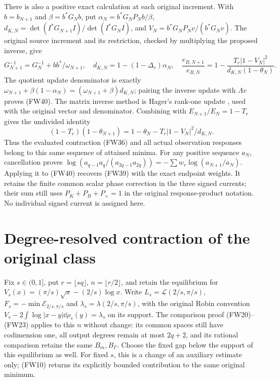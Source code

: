 \documentclass[11pt]{article}
\begin{document}
There is also a positive exact calculation at each original increment.
With $b=b_{N+1}$ and $\beta=b^*G_Nb$, put
$\alpha_N=b^*G_NP_Nb/\beta$,
$d_{K,N}=\det(I^*G_{N+1}I)/\det(I^*G_NI)$, and
$V_N=b^*G_NP_Nv/(b^*G_Nv)$. The original source increment and its
restriction, checked by multiplying the proposed inverse, give
\begin{equation}\tag{FW40}
 G_{N+1}^{-1}=G_N^{-1}+bb^*/\omega_{N+1},\quad
 d_{K,N}=1-(1-\Delta_r)\alpha_N,\quad
 \frac{e_{B,N+1}}{e_{B,N}}
 =1-\frac{T_r|1-V_N|^2}{d_{K,N}(1-\theta_N)}.
\end{equation}
The quotient update denominator is exactly
$\omega_{N+1}+\beta(1-\alpha_N)=(\omega_{N+1}+\beta)d_{K,N}$;
pairing the inverse update with $\Lambda v$ proves (FW40).
The matrix inverse method is Hager's rank-one update \cite{Hager},
used with the original vector and denominator. Combining with
$E_{N+1}/E_N=1-T_r$ gives the undivided identity
\[
 (1-T_r)(1-\theta_{N+1})
 =1-\theta_N-T_r|1-V_N|^2/d_{K,N}.
\]
Thus the evaluated contraction (FW36) and all actual observation responses
belong to this same sequence of attained minima. For any positive sequence
$a_N$, cancellation proves
$\log(a_{q-1}a_q/(a_{2q-1}a_{2q}))=-\sum w_r\log(a_{N+1}/a_N)$.
Applying it to (FW40) recovers (FW39) with the exact endpoint weights.
It retains the finite common scalar phase correction in the three signed
currents; their sum still uses $P_K+P_B+P_\times=1$ in the original
response-product notation. No individual signed current is assigned here.

\section{Degree-resolved contraction of the original class}
Fix $s\in(0,1]$, put $r=\lfloor sq\rfloor$, $n=\lfloor r/2\rfloor$,
and retain the equilibrium for
$V_s(x)=(\pi/s)\sqrt x-(2/s)\log x$.
Write $L_s=\mathcal L(2/s,\pi/s)$, $F_s=-\min\mathcal E_{2/s,\pi/s}$
and $\lambda_s=\lambda(2/s,\pi/s)$, with the original Robin convention
$V_s-2\int\log|x-y|\dd\rho_s(y)=\lambda_s$ on its support.
The comparison proof (FW20)--(FW23) applies to this $n$ without change:
its common spaces still have codimension one, all output degrees remain
at most $2q+2$, and its rational comparison retains the same $B_m,B_\Gamma$.
Choose the fixed gap below the support of this equilibrium as well.
For fixed $s$, this is a change of an auxiliary estimate only; (FW10)
returns its explicitly bounded contribution to the same original minimum.
\end{document}
